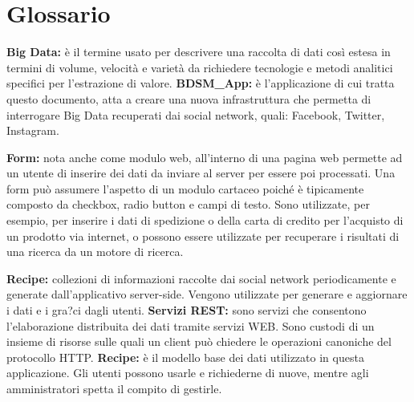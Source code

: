 %

\section{Glossario} %
\label{sec:glossario}
	
	\textbf{Big Data:} è il termine usato per descrivere una raccolta di dati così estesa in termini di volume, velocità e varietà da richiedere tecnologie e metodi analitici specifici per l'estrazione di valore.
	\newline
	\textbf{BDSM\_App:} è l'applicazione di cui tratta questo documento, atta a creare una nuova infrastruttura che permetta di interrogare Big Data recuperati dai social network, quali: Facebook, Twitter, Instagram.

	\textbf{Form:} nota anche come modulo web, all'interno di una pagina web permette
ad un utente di inserire dei dati da inviare al server per essere poi processati.
Una form può assumere l'aspetto di un modulo cartaceo poiché è tipicamente
composto da checkbox, radio button e campi di testo. Sono utilizzate, per
esempio, per inserire i dati di spedizione o della carta di credito per l'acquisto
di un prodotto via internet, o possono essere utilizzate per recuperare i risultati
di una ricerca da un motore di ricerca.

	\textbf{Recipe:} collezioni di informazioni raccolte dai social network periodicamente e generate dall'applicativo server-side. Vengono utilizzate per generare e aggiornare i dati e i gra?ci dagli utenti.
	\newline
	\textbf{Servizi REST:} sono servizi che consentono l’elaborazione distribuita dei dati tramite servizi WEB. Sono custodi di un insieme di risorse sulle quali un client può chiedere le operazioni canoniche del protocollo HTTP.
	\newline
	\textbf{Recipe:} è il modello base dei dati utilizzato in questa applicazione. Gli utenti possono usarle e richiederne di nuove, mentre agli amministratori spetta il compito di gestirle.
